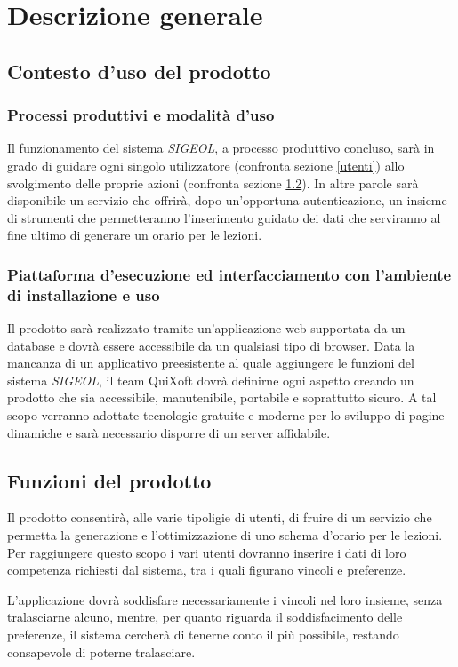 \documentclass[11pt,a4paper]{article}
\begin{document}
\section{Descrizione generale}
\subsection{Contesto d'uso del prodotto}
\subsubsection{Processi produttivi e modalità d'uso}
Il funzionamento del sistema \textit{SIGEOL}, a processo produttivo concluso, sarà in grado di guidare ogni singolo utilizzatore (confronta sezione \ref{utenti}) allo svolgimento delle proprie azioni (confronta sezione \ref{funzioni}). In altre parole sarà disponibile un servizio che offrirà, dopo un'opportuna autenticazione, un insieme di strumenti che permetteranno l'inserimento guidato dei dati che serviranno al fine ultimo di generare un orario per le lezioni.
\subsubsection{Piattaforma d’esecuzione ed interfacciamento con l’ambiente di installazione e uso}
Il prodotto sarà realizzato tramite un'applicazione web supportata da un database e dovrà essere accessibile da un qualsiasi tipo di browser. Data la mancanza di un applicativo preesistente al quale aggiungere le funzioni del sistema \textit{SIGEOL}, il team QuiXoft dovrà definirne ogni aspetto creando un prodotto che sia accessibile, manutenibile, portabile e soprattutto sicuro. A tal scopo verranno adottate tecnologie gratuite e moderne per lo sviluppo di pagine dinamiche e sarà necessario disporre di un server affidabile.
\subsection{Funzioni del prodotto} \label{funzioni}
Il prodotto consentirà, alle varie tipoligie di utenti, di fruire di un servizio che permetta la generazione e l'ottimizzazione di uno schema d'orario per le lezioni. Per raggiungere questo scopo i vari utenti dovranno inserire i dati di loro competenza richiesti dal sistema, tra i quali figurano vincoli e preferenze.

L'applicazione dovrà soddisfare necessariamente i vincoli nel loro insieme, senza tralasciarne alcuno, mentre, per quanto riguarda il soddisfacimento delle preferenze, il sistema cercherà di tenerne conto il più possibile, restando consapevole di poterne tralasciare.
\end{document}
